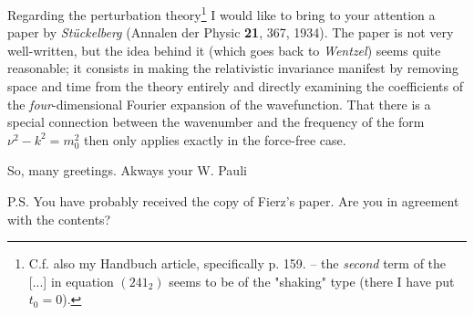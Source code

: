 Regarding the perturbation theory\footnote{C.f. also my Handbuch article, specifically p. 159. -- the \textit{second} term of the [...] in equation $(241_2)$ seems to be of the "shaking" type (there I have put $t_0=0$).} I would like to bring to your attention a paper by \textit{St\"uckelberg} (Annalen der Physic \textbf{21}, 367, 1934). The paper is not very well-written, but the idea behind it (which goes back to \textit{Wentzel}) seems quite reasonable; it consists in making the relativistic invariance manifest by removing space and time from the theory entirely and directly examining the coefficients of the \textit{four}-dimensional Fourier expansion of the wavefunction. That there is a special connection between the wavenumber and the frequency of the form $\nu^2-k^2=m_0^2$ then only applies exactly in the force-free case.

So, many greetings.
Akways your W. Pauli

P.S. You have probably received the copy of Fierz's paper. Are you in agreement with the contents?

